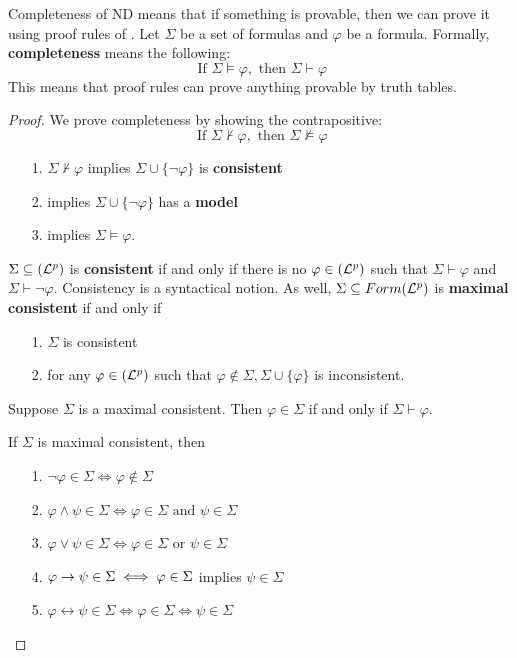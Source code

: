 \documentclass[english, 11pt]{article}
\begin{document}
  \begin{defn}[completeness]\label{completeness}
  Completeness of ND means that if something is provable, then we can prove it using proof rules of . Let $\Sigma$ be a set of formulas and $\varphi$ be a formula. Formally, \textbf{completeness} means the following:
  \[ \mbox{ If \ } \Sigma \models \varphi, \mbox{ \ then \ } \Sigma \vdash \varphi \]
  This means that  proof rules can prove anything provable by truth tables.
  \end{defn}

  \begin{proof}
    We prove completeness by showing the contrapositive:
    \[ \mbox{ If \ } \Sigma \not \vdash \varphi, \mbox{ \ then \ } \Sigma \not \models \varphi  \]
    \begin{itemize}
      \item[1.] $\Sigma \not \vdash \varphi$ implies $\Sigma \cup \{ \neg \varphi \}$ is \textbf{consistent}
      \item[2.] implies $\Sigma \cup \{ \neg \varphi \}$ has a \textbf{model}
      \item[3.] implies $\Sigma \models \varphi$.
    \end{itemize}
    $\Sigma \subseteq (\mathcal{L}^p)$ is \textbf{consistent} if and only if there is no $\varphi \in ( \mathcal{L}^p )$ such that $\Sigma \vdash \varphi$ and $\Sigma \vdash \neg \varphi$. Consistency is a syntactical notion. As well, $\Sigma \subseteq Form(\mathcal{L}^p)$ is \textbf{maximal consistent} if and only if
    \begin{itemize}
      \item[1.] $\Sigma$ is consistent
      \item[2.] for any $\varphi \in (\mathcal{L}^p)$ such that $\varphi \not \in \Sigma, \Sigma \cup \{ \varphi \}$ is inconsistent.
    \end{itemize}

    \begin{lem}
      Suppose $\Sigma$ is a maximal consistent. Then $\varphi \in \Sigma$ if and only if $\Sigma \vdash \varphi$.
    \end{lem}

    \begin{lem}
    If $\Sigma$ is maximal consistent, then
      \begin{itemize}
        \item[1.] $\neg \varphi \in \Sigma \iff \varphi \not \in \Sigma$
        \item[2.] $\varphi \land \psi \in \Sigma \iff \varphi \in \Sigma \mbox{ \ and \ } \psi \in \Sigma$
        \item[3.] $\varphi \lor \psi \in \Sigma \iff \varphi \in \Sigma \mbox{ \ or \ } \psi \in \Sigma$
        \item[4.] $\varphi \rightarrow \psi \in \Sigma \iff \varphi \in \Sigma$ implies $\psi \in \Sigma$
        \item[5.] $\varphi \leftrightarrow \psi \in \Sigma \iff \varphi \in \Sigma \iff \psi \in \Sigma$
      \end{itemize}
    \end{lem}


\end{proof}
\end{document}
